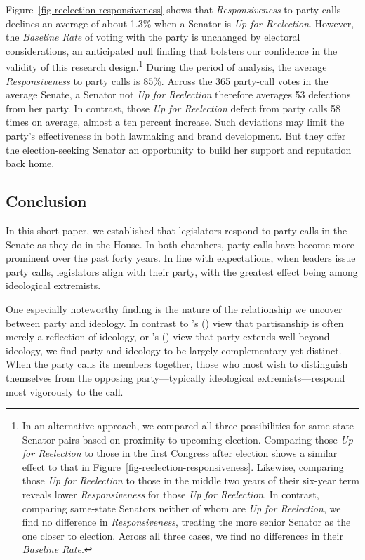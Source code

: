 \documentclass[12pt]{article}
\def\citeapos#1{\citeauthor{#1}'s (\citeyear{#1})}
\begin{document}
Figure~\ref{fig-reelection-responsiveness} shows that \textit{Responsiveness}
to party calls declines an average of about 1.3\% when a Senator is
\textit{Up for Reelection}.
However, the \textit{Baseline Rate} of voting with the party is unchanged by
electoral considerations, an anticipated null finding that bolsters our
confidence in the validity of this research design.\footnote{
  \doublespacing\normalsize
  In an alternative approach, we compared all three possibilities for
  same-state Senator pairs based on proximity to upcoming election.
  Comparing those \textit{Up for Reelection} to those in the first Congress
  after election shows a similar effect to that in
  Figure~\ref{fig-reelection-responsiveness}.
  Likewise, comparing those \textit{Up for Reelection} to those in the middle
  two years of their six-year term reveals lower \textit{Responsiveness} for
  those \textit{Up for Reelection}.
  In contrast, comparing same-state Senators neither of whom are
  \textit{Up for Reelection}, we find no difference in \textit{Responsiveness},
  treating the more senior Senator as the one closer to election.
  Across all three cases, we find no differences in their
  \textit{Baseline Rate}.}
During the period of analysis, the average \textit{Responsiveness} to party
calls is 85\%.
Across the 365 party-call votes in the average Senate, a Senator not
\textit{Up for Reelection} therefore averages 53 defections from her party.
In contrast, those \textit{Up for Reelection} defect from party calls 58 times
on average, almost a ten percent increase.
Such deviations may limit the party's effectiveness in both lawmaking and brand
development.
But they offer the election-seeking Senator an opportunity to build her support
and reputation back home.

\subsection*{Conclusion}

In this short paper, we established that legislators respond to party calls in
the Senate as they do in the House.
In both chambers, party calls have become more prominent over the past forty
years.  In line with expectations, when leaders issue party calls, legislators
align with their party, with the greatest effect being among ideological
extremists.

One especially noteworthy finding is the nature of the relationship we uncover
between party and ideology.
In contrast to \citeapos{Krehbiel:1993} view that partisanship is often merely
a reflection of ideology, or \citeapos{Lee:2009} view that party extends well
beyond ideology, we find party and ideology to be largely complementary yet
distinct.
When the party calls its members together, those who most wish to distinguish
themselves from the opposing party---typically ideological extremists---respond
most vigorously to the call.
\end{document}
